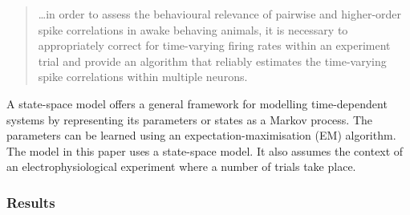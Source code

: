 \documentclass[a4paper,12pt]{article}
\theoremstyle{definition}
\begin{document}
	\begin{quotation}
	\dots in order to assess the behavioural relevance of pairwise and higher-order spike correlations in awake behaving animals, it is necessary to appropriately correct for time-varying firing rates within an experiment trial and provide an algorithm that reliably estimates the time-varying spike correlations within multiple neurons.
	\end{quotation}
	
	A state-space model offers a general framework for modelling time-dependent systems by representing its parameters or states as a Markov process. The parameters can be learned using an expectation-maximisation (EM) algorithm. The model in this paper uses a state-space model. It also assumes the context of an electrophysiological experiment where a number of trials take place. 
	
\subsubsection*{Results}

	
\end{document}
